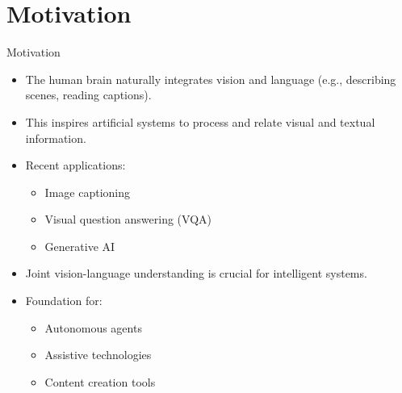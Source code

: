 \section{Motivation}

\begin{frame}[allowframebreaks]{Motivation}
    \large
    \begin{itemize}
        \item The human brain naturally integrates vision and language (e.g., describing scenes, reading captions).
        \item This inspires artificial systems to process and relate visual and textual information.
        \item Recent applications:
        \begin{itemize}
            \item Image captioning
            \item Visual question answering (VQA)
            \item Generative AI
        \end{itemize}
\framebreak
        \item Joint vision-language understanding is crucial for intelligent systems.
        \item Foundation for:
        \begin{itemize}
            \item Autonomous agents
            \item Assistive technologies
            \item Content creation tools
        \end{itemize}
    \end{itemize}
\end{frame}